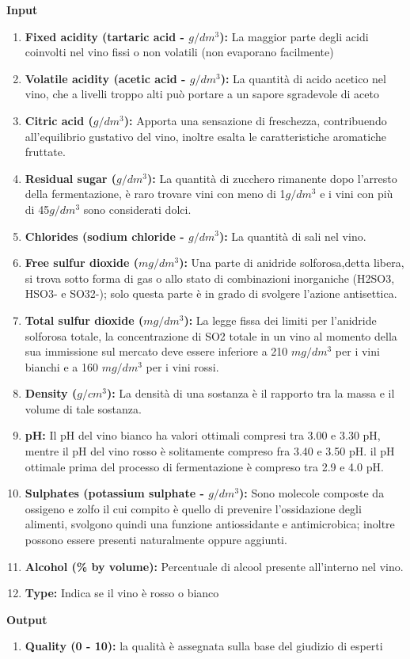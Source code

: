 \noindent
\textbf{Input}
\begin{enumerate}
    \item \textbf{Fixed acidity (tartaric acid - $g / dm^3$):} La maggior parte degli acidi coinvolti nel vino fissi o non volatili (non evaporano facilmente)
    \item \textbf{Volatile acidity (acetic acid - $g / dm^3$):} La quantità di acido acetico nel vino, che a livelli troppo alti può portare a un sapore sgradevole di aceto
    \item \textbf{Citric acid ($g / dm^3$):} Apporta una sensazione di freschezza, contribuendo all'equilibrio gustativo del vino, inoltre esalta le caratteristiche aromatiche fruttate.
    \item \textbf{Residual sugar ($g / dm^3$):} La quantità di zucchero rimanente dopo l'arresto della fermentazione, è raro trovare vini con meno di 1$g / dm^3$ e i vini con più di 45$g / dm^3$ sono considerati dolci.
    \item \textbf{Chlorides (sodium chloride - $g / dm^3$):} La quantità di sali nel vino.
    \item \textbf{Free sulfur dioxide ($mg / dm^3$):} Una parte di anidride solforosa,detta libera, si trova sotto forma di gas o allo stato di combinazioni inorganiche (H2SO3, HSO3- e SO32-); solo questa parte è in grado di svolgere l'azione antisettica.
    \item \textbf{Total sulfur dioxide ($mg / dm^3$):} La legge fissa dei limiti per l'anidride solforosa totale, la concentrazione di SO2 totale in un vino al momento della sua immissione sul mercato deve essere inferiore a 210 $mg / dm^3$ per i vini bianchi e a 160 $mg / dm^3$ per i vini rossi.
    \item \textbf{Density ($g / cm^3$):} La densità di una sostanza è il rapporto tra la massa e il volume di tale sostanza.
    \item \textbf{pH:} Il pH del vino bianco ha valori ottimali compresi tra 3.00 e 3.30 pH, mentre il pH del vino rosso è solitamente compreso fra 3.40 e 3.50 pH. il pH ottimale prima del processo di fermentazione è compreso tra 2.9 e 4.0 pH.
    \item \textbf{Sulphates (potassium sulphate - $g / dm^3$):} Sono molecole composte da ossigeno e zolfo il cui compito è quello di prevenire l'ossidazione degli alimenti, svolgono quindi una funzione antiossidante e antimicrobica; inoltre possono essere presenti naturalmente oppure aggiunti.
    \item \textbf{Alcohol (\% by volume):} Percentuale di alcool presente all'interno nel vino.
    \item \textbf{Type:} Indica se il vino è rosso o bianco
\end{enumerate}

\noindent
\textbf{Output}
\begin{enumerate}
    \addtocounter{enumi}{11}
    \item \textbf{Quality (0 - 10):} la qualità è assegnata sulla base del giudizio di esperti
\end{enumerate}




